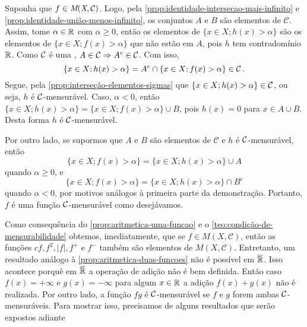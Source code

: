 \begin{prova}
    Suponha que $f \in \operatorname{\textit{M}(\textit{X}, \mathcal{C} )}$. 
    Logo, pela \ref{prop:identidade-intersecao-mais-infinito} e \ref{prop:identidade-união-menos-infinito}, os conjuntos $A$ e $B$ são elementos de $\mathcal{C}$.
    Assim, tome $\alpha \in \mathbb{R}$ com $\alpha \geq 0$, então os elementos de $\{x \in X; h(x) > \alpha\}$ são os elementos de $\{x \in X; f(x) > \alpha\}$ que não estão em $A$, pois $h$ tem contradomínio $\mathbb{R}$.
    Como $\operatorname{\mathcal{C}}$ é uma \sigal\hspace{-0.1cm}, $A \in \operatorname{\mathcal{C}} \Rightarrow A^c \in \operatorname{\mathcal{C}}$. 
    Com isso, 
    \vspace{-0.2cm}
    $$
    \{x \in X; h(x) > \alpha\} = A^c\cap \{x \in X; f(x) > \alpha\} \in \cc.
    \vspace{-0.2cm}
    $$
    Segue, pela  \ref{prop:interseção-elementos-sigmas} que $\{x \in X; h(x) > \alpha\} \in \operatorname{\mathcal{C}}$, ou seja, $h$ é $\operatorname{\mathcal{C}}$-mensurável.
    Caso, $\alpha < 0$, então $\{x \in X; h(x) > \alpha\} = \{x \in  X ; f(x) > \alpha\} \cup B $, pois $h(x) = 0$ para $x \in A \cup B$.
    Desta forma $h$ é $\operatorname{\mathcal{C}}$-mensurável.

    Por outro lado, se supormos que $A$ e $B$ são elementos de $\mathcal{C}$ e $h$ é $\operatorname{\mathcal{C}}$-mensurável, então
    $$\{x \in X; f(x) > \alpha\} = \{x \in  X ; h(x) > \alpha\} \cup A $$
    quando $\alpha \geq 0$, e 
    $$\{x \in X; f(x) > \alpha\} = \{x \in  X ; h(x) > \alpha\} \cap B^c $$
    quando  $\alpha < 0$, por motivos análogos à primeira parte da demonstração.
    Portanto, $f$ é uma função $\operatorname{\mathcal{C}}$-mensurável como desejávamos.
\end{prova}

Como consequência do \ref{prop:aritmetica-uma-funcao} e o \ref{teo:condição-de-mensurabilidade} obtemos, imediatamente, que se $ f \in M(X,\mathcal{C})$, então as funções $cf, f^2, |f|, f^+$ e $f^-$ também são elementos de $M(X, \mathcal{C})$.
Entretanto, um resultado análogo à \ref{prop:aritmetica-duas-funcoes} não é possível em $\operatorname{\overline{\mathbb{R}}}$.
Isso acontece porquê em $\operatorname{\overline{\mathbb{R}}}$ a operação de adição não é bem definida.
Então caso $f(x) = +\infty$ e $g(x) = -\infty$ para algum $x \in \mathbb{R}$ a adição
$f(x) + g(x)$ não é realizada.
Por outro lado, a função $fg$ é $\operatorname{\mathcal{C}}$-mensurável se $f$ e $g$ forem ambas $\operatorname{\mathcal{C}}$-mensuráveis.
Para mostrar isso, precisamos de alguns resultados que serão expostos adiante

